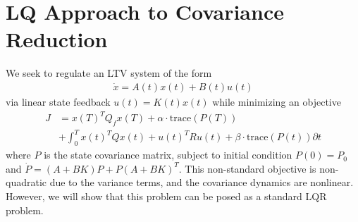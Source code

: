 \documentclass[10pt,a4paper]{article}
\begin{document}
	
	
	\section{LQ Approach to Covariance Reduction}
	We seek to regulate an LTV system of the form 
	\begin{align}
	\dot{x} = A(t)x(t) + B(t)u(t) 
	\end{align}
	via linear state feedback $u(t) = K(t)x(t)$ while minimizing an objective 
		\begin{align}
	J &= x(T)^TQ_fx(T) + \alpha \cdot \mathrm{trace}(P(T)) \nonumber\\
	&+ \int_{0}^{T}x(t)^TQx(t) + u(t)^TRu(t) + \beta\cdot \mathrm{trace}(P(t)) \partial t
	\end{align}	
	where $P$ is the state covariance matrix, subject to initial condition $P(0) = P_0$ and $\dot{P} = (A+BK)P + P(A+BK)^T$.
	This non-standard objective is non-quadratic due to the variance terms, and the covariance dynamics are nonlinear. However, we will show that this problem can be posed as a standard LQR problem.
		
\end{document}
